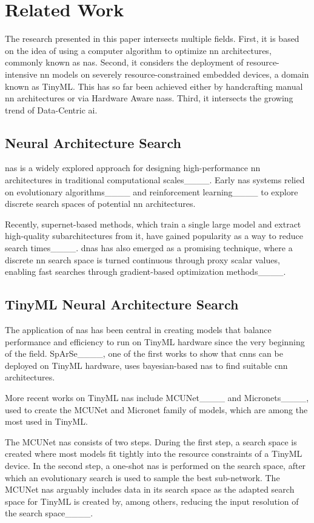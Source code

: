 \section{Related Work}
\label{sec:related_work}
The research presented in this paper intersects multiple fields.
First, it is based on the idea of using a computer algorithm to optimize \gls{nn} architectures, commonly known as \gls{nas}.
Second, it considers the deployment of resource-intensive \gls{nn} models on severely resource-constrained embedded devices, a domain known as TinyML.
This has so far been achieved either by handcrafting manual \gls{nn} architectures or via Hardware Aware \glspl{nas}.
Third, it intersects the growing trend of Data-Centric \gls{ai}.

\subsection{Neural Architecture Search}
\Gls{nas} is a widely explored approach for designing high-performance \gls{nn} architectures in traditional computational scales____.
Early \gls{nas} systems relied on evolutionary algorithms____ and reinforcement learning____ to explore discrete search spaces of potential \gls{nn} architectures.

Recently, supernet-based methods, which train a single large model and extract high-quality subarchitectures from it, have gained popularity as a way to reduce search times____.
\Gls{dnas} has also emerged as a promising technique, where a discrete \gls{nn} search space is turned continuous through proxy scalar values, enabling fast searches through gradient-based optimization methods____.

\subsection{TinyML Neural Architecture Search}
The application of \gls{nas} has been central in creating models that balance performance and efficiency to run on TinyML hardware since the very beginning of the field.
SpArSe____, one of the first works to show that \glspl{cnn} can be deployed on TinyML hardware, uses bayesian-based \gls{nas} to find suitable \gls{cnn} architectures.

More recent works on TinyML \gls{nas} include MCUNet____ and Micronets____, used to create the MCUNet and Micronet family of models, which are among the most used in TinyML.

The MCUNet \gls{nas} consists of two steps.
During the first step, a search space is created where most models fit tightly into the resource constraints of a TinyML device.
In the second step, a one-shot \gls{nas} is performed on the search space, after which an evolutionary search is used to sample the best sub-network.
The MCUNet \gls{nas} arguably includes data in its search space as the adapted search space for TinyML is created by, among others, reducing the input resolution of the search space____.

